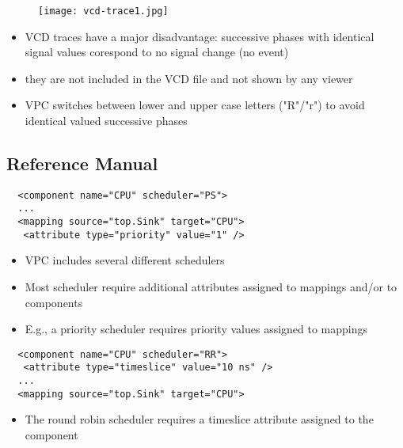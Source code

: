 \begin{frame}[t]
\begin{figure}
\centering
\texttt{[image: vcd-trace1.jpg]}
\end{figure}

\begin{itemize}
\item VCD traces have a major disadvantage: successive phases with identical signal values corespond to no signal change (no event)
\item they are not included in the VCD file and not shown by any viewer
\item VPC switches between lower and upper case letters ("R"/"r") to avoid identical valued successive phases
\end{itemize}

\end{frame}


\subsection{Reference Manual}


\begin{frame}[fragile=singleslide]
\begin{lstlisting}
  <component name="CPU" scheduler="PS">
  ...
  <mapping source="top.Sink" target="CPU">
   <attribute type="priority" value="1" />
\end{lstlisting}
\begin{itemize}
\item VPC includes several different schedulers
\item Most scheduler require additional attributes assigned to mappings and/or to components
\item E.g., a priority scheduler requires priority values assigned to mappings
\end{itemize}
\begin{lstlisting}
  <component name="CPU" scheduler="RR">
   <attribute type="timeslice" value="10 ns" />
  ...
  <mapping source="top.Sink" target="CPU">
\end{lstlisting}
\begin{itemize}
\item The round robin scheduler requires a timeslice attribute assigned to the component
\end{itemize}
\end{frame}


